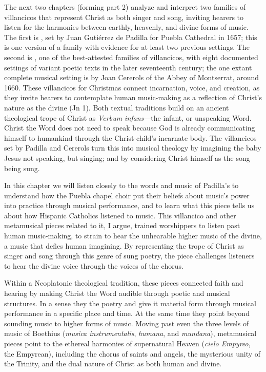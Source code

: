 The next two chapters (forming part 2) analyze and interpret two families of
villancicos that represent Christ as both singer and song, inviting hearers to
listen for the harmonies between earthly, heavenly, and divine forms of music.
The first is , set by Juan Gutiérrez de Padilla
for Puebla Cathedral in 1657; this is one version of a family with evidence for
at least two previous settings.
The second is , one of the
best-attested families of villancicos, with eight documented settings of variant
poetic texts in the later seventeenth century; the one extant complete musical
setting is by Joan Cererols of the Abbey of Montserrat, around 1660.
These villancicos for Christmas connect incarnation, voice, and creation, as
they invite hearers to contemplate human music-making as a reflection of
Christ's nature as the divine  (Jn 1).
Both textual traditions build on an ancient theological trope of Christ as
\emph{Verbum infans}---the infant, or unspeaking Word.
Christ the Word does not need to speak because God is already communicating
himself to humankind through the Christ-child's incarnate body.
The villancicos set by Padilla and Cererols turn this into musical theology by
imagining the baby Jesus not speaking, but singing; and by considering Christ
himself as the song being sung.

In this chapter we will listen closely to the words and music of Padilla's
 to understand how the Puebla chapel choir put
their beliefs about music's power into practice through musical performance, and
to learn what this piece tells us about how Hispanic Catholics listened to
music.
This villancico and other metamusical pieces related to it, I argue, trained
worshippers to listen past human music-making, to strain to hear the unhearable
higher music of the divine, a music that defies human imagining.
By representing the trope of Christ as singer and song through this genre of
sung poetry, the piece challenges listeners to hear the divine voice through the
voices of the chorus.

Within a Neoplatonic theological tradition, these pieces connected faith and
hearing by making Christ the Word audible through poetic and musical structures.
In a sense they  the poetry and give it material form through
musical performance in a specific place and time.
At the same time they point beyond sounding music to higher forms of music.
Moving past even the three levels of music of Boethius (\emph{musica
instrumentalis}, \emph{humana}, and \emph{mundana}), metamusical pieces point to
the ethereal harmonies of supernatural Heaven (\emph{cielo Empyreo}, the
Empyrean), including the chorus of saints and angels, the mysterious unity of
the Trinity, and the dual nature of Christ as both human and divine.

